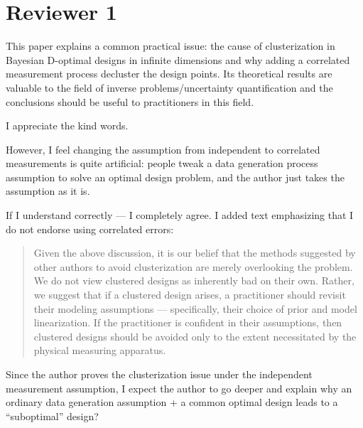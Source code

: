 \section{Reviewer 1}\label{ref1}
\RC This paper explains a common practical issue: the cause of
clusterization in Bayesian D-optimal designs in infinite dimensions
and why adding a correlated measurement process decluster the design
points. Its theoretical results are valuable to the field of inverse
problems/uncertainty quantification and the conclusions should be
useful to practitioners in this field.

\AR I appreciate the kind words.


\RC However, I feel changing the assumption from independent to correlated
measurements is quite artificial: people tweak a data generation
process assumption to solve an optimal design problem, and the author
just takes the assumption as it is.

\AR If I understand correctly --- I completely agree. I added text
emphasizing that I do not endorse using correlated errors:

\begin{quote} %
Given the above discussion, it is our belief that the methods
suggested by other authors to avoid clusterization are merely
overlooking the problem. We do not view clustered designs as
inherently bad on their own. Rather, we suggest that if a clustered
design arises, a practitioner should revisit their modeling
assumptions --- specifically, their choice of prior and model
linearization. If the practitioner is confident in their assumptions,
then clustered designs should be avoided only to the extent
necessitated by the physical measuring apparatus.
\end{quote}

\RC Since the author proves the clusterization issue under the independent
measurement assumption, I expect the author to go deeper and explain
why an ordinary data generation assumption + a common optimal design
leads to a “suboptimal” design?

